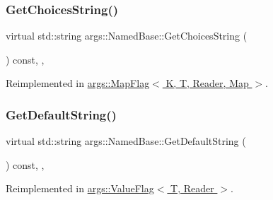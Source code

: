 \subsubsection{\texorpdfstring{Get\+Choices\+String()}{GetChoicesString()}}
{\footnotesize\ttfamily virtual std\+::string args\+::\+Named\+Base\+::\+Get\+Choices\+String (\begin{DoxyParamCaption}\item[{const \hyperlink{structargs_1_1_help_params}{Help\+Params} \&}]{ }\end{DoxyParamCaption}) const\hspace{0.3cm}{\ttfamily [inline]}, {\ttfamily [protected]}, {\ttfamily [virtual]}}



Reimplemented in \hyperlink{classargs_1_1_map_flag_a7fe91b5ef6696b82aa8999884bbf727d}{args\+::\+Map\+Flag$<$ K, T, Reader, Map $>$}.

\mbox{\label{classargs_1_1_named_base_a5866b205907d924423eb8aac9a9e65f8}} 
\subsubsection{\texorpdfstring{Get\+Default\+String()}{GetDefaultString()}}
{\footnotesize\ttfamily virtual std\+::string args\+::\+Named\+Base\+::\+Get\+Default\+String (\begin{DoxyParamCaption}\item[{const \hyperlink{structargs_1_1_help_params}{Help\+Params} \&}]{ }\end{DoxyParamCaption}) const\hspace{0.3cm}{\ttfamily [inline]}, {\ttfamily [protected]}, {\ttfamily [virtual]}}



Reimplemented in \hyperlink{classargs_1_1_value_flag_a47aa01f545a1781583c96af12c8e2062}{args\+::\+Value\+Flag$<$ T, Reader $>$}.

\mbox{\label{classargs_1_1_named_base_ab0b9e1f22abf04b24659fada61a6d665}} 
